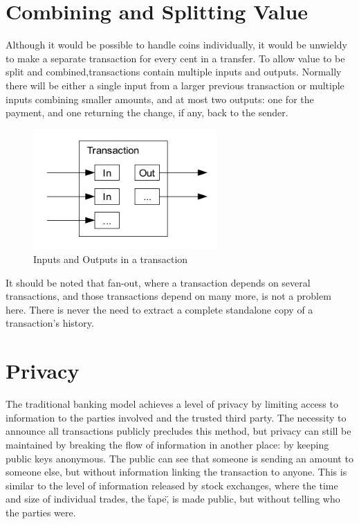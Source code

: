\section{Combining and Splitting Value}

Although it would be possible to handle coins individually, it would be unwieldy to make a separate transaction for every cent in a transfer. To allow value to be split and combined,transactions contain multiple inputs and outputs. Normally there will be either a single input from a larger previous transaction or multiple inputs combining smaller amounts, and at most two outputs: one for the payment, and one returning the change, if any, back to the sender.

\begin{figure}[ht!]
\centering
\includegraphics[trim = 0mm 0mm 0mm 0mm, width=70mm]{multiple_in_outs_transaction}
\caption{Inputs and Outputs in a transaction}
\end{figure}

It should be noted that fan-out, where a transaction depends on several transactions, and those transactions depend on many more, is not a problem here. There is never the need to extract a complete standalone copy of a transaction's history.

\section{Privacy}

The traditional banking model achieves a level of privacy by limiting access to information to the parties involved and the trusted third party. The necessity to announce all transactions publicly precludes this method, but privacy can still be maintained by breaking the flow of information in another place: by keeping public keys anonymous. The public can see that someone is sending an amount to someone else, but without information linking the transaction to anyone. This is similar to the level of information released by stock exchanges, where the time and size of individual trades, the \"tape\", is made public, but without telling who the parties were.

